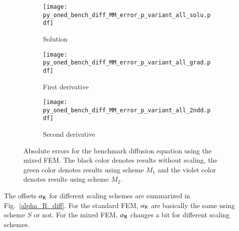 \documentclass[review,3p]{elsarticle}
\begin{document}
\begin{figure}[!ht]
    \begin{subfigure}{5.4cm}
        \texttt{[image: py\_oned\_bench\_diff\_MM\_error\_p\_variant\_all\_solu.pdf]}
        \caption{Solution}
        \label{py_oned_bench_diff_MM_error_p_variant_all_solu}
    \end{subfigure}
    \hspace{-0.18cm}
    \begin{subfigure}{5.4cm}
        \texttt{[image: py\_oned\_bench\_diff\_MM\_error\_p\_variant\_all\_grad.pdf]}
        \caption{First derivative}
        \label{py_oned_bench_diff_MM_error_p_variant_all_grad}
    \end{subfigure}
    \hspace{-0.18cm}
    \begin{subfigure}{5.4cm}
        \texttt{[image: py\_oned\_bench\_diff\_MM\_error\_p\_variant\_all\_2ndd.pdf]}
        \caption{Second derivative}
        \label{py_oned_bench_diff_MM_error_p_variant_all_2ndd}
    \end{subfigure}
\caption{Absolute errors for the benchmark diffusion equation using the mixed FEM. The black color denotes results without scaling, the green color denotes results using scheme $M_1$ and the violet color denotes results using scheme $M_2$. }
\label{py_oned_bench_diff_MM_error_p_variant_all}    
\end{figure}
\newpage

The offsets $\alpha_{\rm R}$ for different scaling schemes are summarized in Fig.~\ref{alpha_R_diff}.
For the standard FEM, $\alpha_{\rm R}$ are basically the same using scheme $S$ or not.
For the mixed FEM, $\alpha_{\rm R}$ changes a bit for different scaling schemes.
\end{document}
